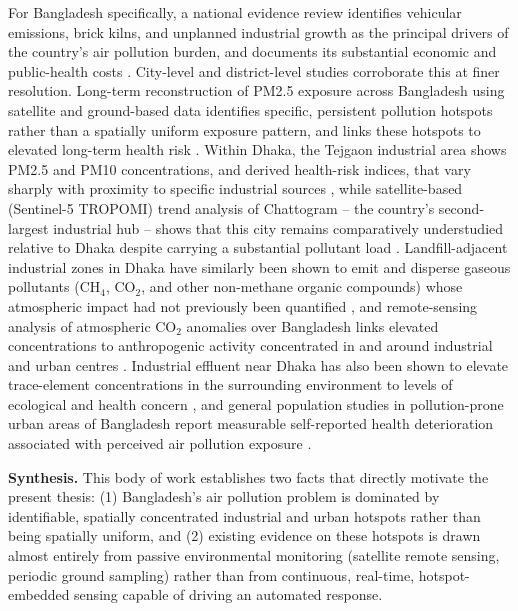 For Bangladesh specifically, a national evidence review identifies vehicular emissions, brick kilns, and unplanned industrial growth as the principal drivers of the country's air pollution burden, and documents its substantial economic and public-health costs \citep{khatun2023evidence}. City-level and district-level studies corroborate this at finer resolution. Long-term reconstruction of PM2.5 exposure across Bangladesh using satellite and ground-based data identifies specific, persistent pollution hotspots rather than a spatially uniform exposure pattern, and links these hotspots to elevated long-term health risk \citep{ali2025longterm}. Within Dhaka, the Tejgaon industrial area shows PM2.5 and PM10 concentrations, and derived health-risk indices, that vary sharply with proximity to specific industrial sources \citep{basak2025spatial}, while satellite-based (Sentinel-5 TROPOMI) trend analysis of Chattogram -- the country's second-largest industrial hub -- shows that this city remains comparatively understudied relative to Dhaka despite carrying a substantial pollutant load \citep{huraira2024spatial}. Landfill-adjacent industrial zones in Dhaka have similarly been shown to emit and disperse gaseous pollutants (CH$_4$, CO$_2$, and other non-methane organic compounds) whose atmospheric impact had not previously been quantified \citep{aurnab2026monitoring}, and remote-sensing analysis of atmospheric CO$_2$ anomalies over Bangladesh links elevated concentrations to anthropogenic activity concentrated in and around industrial and urban centres \citep{ghosh2026spatiotemporal}. Industrial effluent near Dhaka has also been shown to elevate trace-element concentrations in the surrounding environment to levels of ecological and health concern \citep{lisa2025investigative}, and general population studies in pollution-prone urban areas of Bangladesh report measurable self-reported health deterioration associated with perceived air pollution exposure \citep{rahman2025perceived}.

\textbf{Synthesis.} This body of work establishes two facts that directly motivate the present thesis: (1) Bangladesh's air pollution problem is dominated by identifiable, spatially concentrated industrial and urban hotspots rather than being spatially uniform, and (2) existing evidence on these hotspots is drawn almost entirely from passive environmental monitoring (satellite remote sensing, periodic ground sampling) rather than from continuous, real-time, hotspot-embedded sensing capable of driving an automated response.

